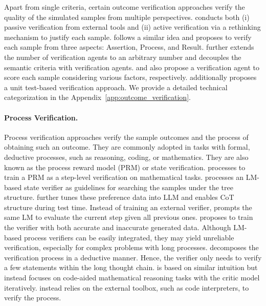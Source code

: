 Apart from single criteria, certain outcome verification approaches verify the quality of the simulated samples from multiple perspectives. 
\citet{liu2023plan} conducts both (i) passive verification from external tools and (ii) active verification via a rethinking mechanism to justify each sample.
\citet{zhang2024wrongofthoughtintegratedreasoningframework} follows a similar idea and proposes to verify each sample from three aspects: Assertion, Process, and Result.
\citet{lifshitz2025multiagent} further extends the number of verification agents to an arbitrary number and decouples the semantic criteria with verification agents. 
\citet{parmar2025plangenmultiagentframeworkgenerating} and \citet{saadfalcon2024archonarchitecturesearchframework} also propose a verification agent to score each sample considering various factors, respectively. \citet{saadfalcon2024archonarchitecturesearchframework} additionally proposes a unit test-based verification approach.
We provide a detailed technical categorization in the Appendix~\ref{app:outcome_verification}.


\paragraph{Process Verification.}
Process verification approaches verify the sample outcomes and the process of obtaining such an outcome. They are commonly adopted in tasks with formal, deductive processes, such as reasoning, coding, or mathematics. They are also known as the process reward model (PRM) or state verification. \citet{lightman2023let} processes to train a PRM as a step-level verification on mathematical tasks. \citet{yao2023tree} processes an LM-based state verifier as guidelines for searching the samples under the tree structure. \citet{zhang2024chain} further tunes these preference data into LLM and enables CoT structure during test time. Instead of training an external verifier, \citet{xie2023selfevaluation} prompts the same LM to evaluate the current step given all previous ones. \citet{hosseini2024vstartrainingverifiersselftaught} proposes to train the verifier with both accurate and inaccurate generated data.
Although LM-based process verifiers can be easily integrated, they may yield unreliable verification, especially for complex problems with long processes. \citet{ling2023deductive} decomposes the verification process in a deductive manner. Hence, the verifier only needs to verify a few statements within the long thought chain. \citet{yu2024siamselfimprovingcodeassistedmathematical} is based on similar intuition but instead focuses on code-aided mathematical reasoning tasks with the critic model iteratively. \citet{li2025startselftaughtreasonertools} instead relies on the external toolbox, such as code interpreters, to verify the process. 


